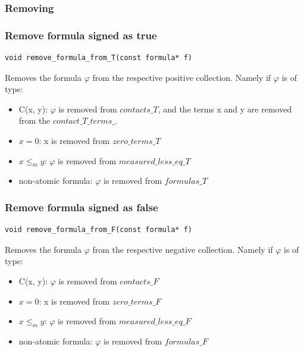 \documentclass{article}
\begin{document}
	\subsubsection*{Removing}
	\subsubsection*{Remove formula signed as true}
\begin{lstlisting}
void remove_formula_from_T(const formula* f)
\end{lstlisting}
	Removes the formula $\varphi$ from the respective positive collection. Namely if $\varphi$ is of type:
	\begin{itemize}
		\item C(x, y): $\varphi$ is removed from $contacts\_T$, and the terms x and y are removed from the $contact\_T\_terms\_$.
		\item $x = 0$: x is removed from $zero\_terms\_T$
		\item $x \le_m y$: $\varphi$ is removed from $measured\_less\_eq\_T$
		\item non-atomic formula: $\varphi$ is removed from $formulas\_T$
	\end{itemize}

	\subsubsection*{Remove formula signed as false}
\begin{lstlisting}
void remove_formula_from_F(const formula* f)
\end{lstlisting}
	Removes the formula $\varphi$ from the respective negative collection. Namely if $\varphi$ is of type:
	\begin{itemize}
		\item C(x, y): $\varphi$ is removed from $contacts\_F$
		\item $x = 0$: x is removed from $zero\_terms\_F$
		\item $x \le_m y$: $\varphi$ is removed from $measured\_less\_eq\_F$
		\item non-atomic formula: $\varphi$ is removed from $formulas\_F$
	\end{itemize}

	\newpage
\end{document}
